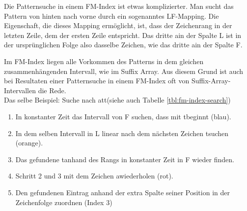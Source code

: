 Die Patternsuche in einem FM-Index ist etwas komplizierter.
Man sucht das Pattern von hinten nach vorne durch ein sogenanntes LF-Mapping.
Die Eigenschaft, die dieses Mapping ermöglicht, ist, dass der Zeichenrang in der letzten Zeile, dem der ersten Zeile entspricht.
Das dritte \glqq a\grqq in der Spalte L ist in der ursprünglichen Folge also dasselbe Zeichen, wie das dritte \glqq a\grqq in der Spalte F.

Im FM-Index liegen alle Vorkommen des Patterns in dem gleichen zusammenhängenden Intervall, wie im Suffix Array.
Aus diesem Grund ist auch bei Resultaten einer Patternsuche in einem FM-Index oft von Suffix-Array-Intervallen die Rede.
\\
Das selbe Beispiel: Suche nach \glqq att\grqq (siehe auch Tabelle \ref{tbl:fm-index-search})
\begin{enumerate}
	\item In konstanter Zeit das Intervall von F suchen, dass mit \glqq t\grqq beginnt (blau).
	\item In dem selben Intervall in L linear nach dem nächsten Zeichen \glqq t\grqq suchen (orange).
	\item Das gefundene \glqq t\grqq anhand des Rangs in konstanter Zeit in F wieder finden.
	\item Schritt 2 und 3 mit dem Zeichen \glqq a\grqq wiederholen (rot).
	\item Den gefundenen Eintrag anhand der extra Spalte seiner Position in der Zeichenfolge zuordnen (Index 3)
\end{enumerate}

